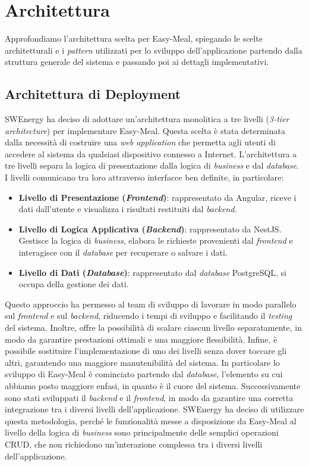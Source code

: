 \section{Architettura}

Approfondiamo l'architettura scelta per Easy-Meal, spiegando le scelte
architetturali e i \textit{pattern} utilizzati per lo sviluppo dell'applicazione partendo
dalla struttura generale del sistema e passando poi ai dettagli implementativi.

\subsection{Architettura di Deployment}

SWEnergy ha deciso di adottare un'architettura monolitica a tre livelli (\textit{3-tier
architecture}) per implementare Easy-Meal. 
Questa scelta è stata determinata dalla necessità di costruire una 
\textit{web application} che permetta agli utenti di accedere al sistema da qualsiasi 
dispositivo connesso a Internet. L'architettura a tre livelli
separa la logica di presentazione dalla logica di \textit{business} e dal \textit{database}.
I livelli comunicano tra loro attraverso interfacce ben definite, in particolare:
\begin{itemize}
	\item \textbf{Livello di Presentazione (\textit{Frontend})}: rappresentato da Angular, riceve i dati dall'utente e visualizza i risultati restituiti dal \textit{backend}.
	\item \textbf{Livello di Logica Applicativa (\textit{Backend})}: rappresentato da NestJS. Gestisce la logica di \textit{business}, elabora le richieste provenienti dal \textit{frontend} e interagisce con il \textit{database} per recuperare o salvare i dati.
	\item \textbf{Livello di Dati (\textit{Database})}: rappresentato dal \textit{database} PostgreSQL, si occupa della gestione dei dati.
\end{itemize}

Questo approccio ha permesso al team di sviluppo di lavorare in modo parallelo 
sul \textit{frontend} e sul \textit{backend}, riducendo i tempi di sviluppo e 
facilitando il \textit{testing} del sistema. Inoltre, offre la possibilità di scalare ciascun 
livello separatamente, in modo da garantire prestazioni ottimali e una 
maggiore flessibilità. Infine, è possibile sostituire l'implementazione di 
uno dei livelli senza dover toccare gli altri, garantendo una maggiore 
manutenibilità del sistema.
In particolare lo sviluppo di Easy-Meal è cominciato partendo dal \textit{database},
l'elemento su cui abbiamo posto maggiore enfasi, in quanto è il cuore del
sistema. Successivamente sono stati sviluppati il \textit{backend} e il
\textit{frontend}, in modo da garantire una corretta integrazione tra i
diversi livelli dell'applicazione. SWEnergy ha deciso di utilizzare questa
metodologia, perché le funzionalità messe a disposizione da Easy-Meal al livello
della logica di \textit{business} sono principalmente delle semplici operazioni CRUD, che non richiedono
un'interazione complessa tra i diversi livelli dell'applicazione.

